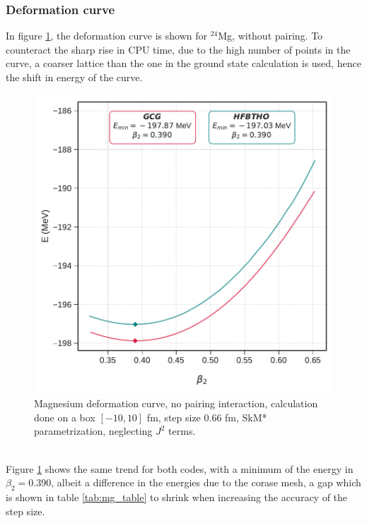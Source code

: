 \subsubsection{Deformation curve}
In figure \ref{fig:mg_no_pair_deformation}, the deformation curve is shown for $^{24}$Mg, without pairing. To counteract the sharp rise in CPU time, due to the high number of points in the curve, a coarser lattice than the one in the ground state calculation is used, hence the shift in energy of the curve.
\begin{figure}[h]
  \centering
  \includegraphics[width=0.8\linewidth]{Images/mg_nopair_curve.pdf}
  \caption{Magnesium deformation curve, no pairing interaction, calculation done on a box $[-10, 10]$ fm, step size 0.66 fm, SkM* parametrization, neglecting $J^2$ terms.}
  \label{fig:mg_no_pair_deformation}
\end{figure}
\\Figure \ref{fig:mg_no_pair_deformation} shows the same trend for both codes, with a minimum of the energy in $\beta_2=0.390$, albeit a difference in the energies due to the corase mesh, a gap which is shown in table \ref{tab:mg_table} to shrink when increasing the accuracy of the step size.
